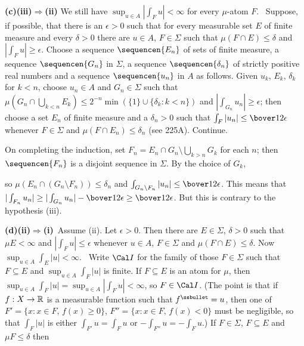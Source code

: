 {\medskip

{\bf (c)(iii)$\Rightarrow$(ii)} We still have $\sup_{u\in
A}|\int_Fu|<\infty$ for every $\mu$-atom $F$.    \Quer\ Suppose, if
possible, that there is an $\epsilon>0$ such that for
every measurable set $E$ of finite measure and every $\delta>0$ there
are $u\in A$, $F\in\Sigma$ such that $\mu(F\cap E)\le\delta$ and
$|\int_Fu|\ge\epsilon$.   Choose a sequence $\sequencen{E_n}$ of sets of
finite measure, a sequence $\sequencen{G_n}$ in $\Sigma$, a sequence
$\sequencen{\delta_n}$ of strictly positive real numbers and a sequence
$\sequencen{u_n}$ in $A$ as follows.      Given $u_k$, $E_k$, $\delta_k$
for $k<n$, choose $u_n\in A$ and $G_n\in\Sigma$  such that
$\mu(G_n\cap\bigcup_{k<n}E_k)\le 2^{-n}\min(\{1\}\cup\{\delta_k:k<n\})$
and $|\int_{G_n}u_n|\ge\epsilon$;  then choose a set $E_n$ of finite
measure and a $\delta_n>0$ such that $\int_F|u_n|\le\bover12\epsilon$
whenever $F\in\Sigma$ and $\mu(F\cap E_n)\le\delta_n$ (see 225A).
Continue.

On completing the induction, set $F_n=E_n\cap
G_n\setminus\bigcup_{k>n}G_k$ for each $n$;  then $\sequencen{F_n}$ is a
disjoint sequence in $\Sigma$.   By the choice of $G_k$,


\noindent so $\mu(E_n\cap(G_n\setminus F_n))\le\delta_n$ and
$\int_{G_n\setminus F_n}|u_n|\le \bover12\epsilon$.   This means that
$|\int_{F_n}u_n|\ge|\int_{G_n}u_n|-\bover12\epsilon\ge\bover12\epsilon$.
But this is contrary to the hypothesis (iii).   \Bang

\medskip

{\bf (d)(ii)$\Rightarrow$(i)}\grheada\  Assume (ii).    Let
$\epsilon>0$.   Then there are $E\in\Sigma$, $\delta>0$ such that
$\mu E<\infty$ and
$|\int_Fu|\le\epsilon$ whenever $u\in A$, $F\in\Sigma$ and
$\mu(F\cap E)\le\delta$.   Now $\sup_{u\in A}\int_E|u|<\infty$.   \Prf\
Write $\Cal I$ for the family of those $F\in\Sigma$ such that
$F\subseteq E$ and $\sup_{u\in A}\int_F|u|$ is finite.   If
$F\subseteq E$ is an atom for $\mu$, then
$\sup_{u\in A}\int_F|u|=\sup_{u\in A}|\int_Fu|<\infty$, so $F\in\Cal I$.
(The point is that if $f:X\to\Bbb R$ is a measurable function such that
$f^{\ssbullet}=u$, then one of $F'=\{x:x\in F,\,f(x)\ge 0\}$,
$F''=\{x:x\in F,\,f(x)<0\}$ must be negligible, so that $\int_F|u|$ is
either $\int_{F'}u=\int_Fu$ or $-\int_{F''}u=-\int_Fu$.)   If
$F\in\Sigma$, $F\subseteq E$ and $\mu F\le\delta$ then

}
